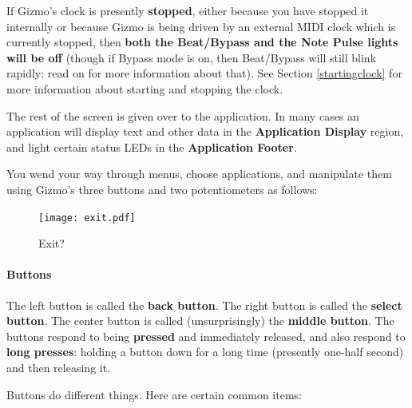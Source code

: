\documentclass{article}
\begin{document}
If Gizmo's clock is presently {\bf stopped}, either because you have stopped it internally or because Gizmo is being driven by an external MIDI clock which is currently stopped, then {\bf both the Beat/Bypass and the Note Pulse lights will be off} (though if Bypass mode is on, then Beat/Bypass will still blink rapidly: read on for more information about that).  See Section \ref{startingclock} for more information about starting and stopping the clock.

The rest of the screen is given over to the application.  In many cases an application will display text and other data in the {\bf Application Display} region, and light certain status LEDs in the {\bf Application Footer}.

You wend your way through menus, choose applications, and manipulate them using Gizmo's three buttons and two potentiometers as follows:

\begin{figure}
\vspace{-1em}
\texttt{[image: exit.pdf]}
\caption{Exit?}
\label{exit}
\vspace{-1em}
\end{figure}

\paragraph{Buttons}  The left button is called the {\bf back button}.  The right button is called the {\bf select button}.  The center button is called (unsurprisingly) the {\bf middle button}.   The buttons respond to being {\bf pressed} and immediately released, and also respond to {\bf long presses}: holding a button down for a long time (presently one-half second) and then releasing it. 

Buttons do different things.  Here are certain common items:
\end{document}
